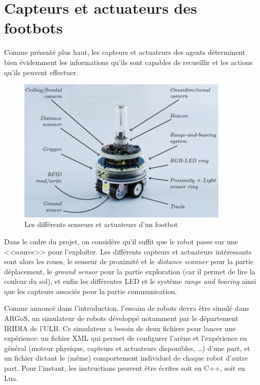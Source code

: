 \section{Capteurs et actuateurs des footbots}

Comme présenté plus haut, les capteurs et actuateurs des agents déterminent bien évidemment les informations qu'ils sont capables de recueillir et les actions qu'ils peuvent effectuer.

\begin{figure}[htb]
  \centering
  \includegraphics[width=0.9\textwidth]{pics/footbot.png}
  \caption{Les différents senseurs et actuateurs d'un footbot~\cite{argosSite1}}
\end{figure}

Dans le cadre du projet, on considère qu'il suffit que le robot passe sur une <<source>> pour l'exploiter. Les différents capteurs et actuateurs intéressants sont alors les roues, le senseur de proximité et le \emph{distance scanner} pour la partie déplacement, le \emph{ground sensor} pour la partie exploration (car il permet de lire la couleur du sol), et enfin les différentes LED et le système \emph{range and bearing} ainsi que les capteurs associés pour la partie communication.

Comme annoncé dans l'introduction, l'essaim de robots devra être simulé dans ARGoS, un simulateur de robots développé notamment par le département IRIDIA de l'ULB. Ce simulateur a besoin de deux fichiers pour lancer une expérience: un fichier XML qui permet de configurer l'arène et l'expérience en général (moteur physique, capteurs et actuateurs disponibles, \ldots) \cite{argosReport} d'une part, et un fichier dictant le (même) comportement individuel de chaque robot d'autre part. Pour l'instant, les instructions peuvent être écrites soit en C++, soit en Lua.


